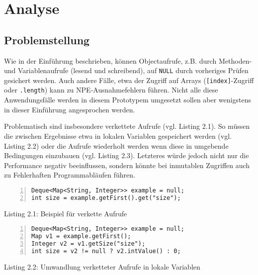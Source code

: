 
\chapter{Analyse}


\section{Problemstellung}

Wie in der Einführung beschrieben, können Objectaufrufe, z.B. durch
Methoden- und Variablenaufrufe (lesend und schreibend), auf \texttt{NULL}
durch vorheriges Prüfen gesichert werden.
Auch andere Fälle, etwa der Zugriff auf Arrays (\texttt{[index]}-Zugriff oder \texttt{.length}) kann
zu NPE-Ausnahmefehlern führen. Nicht alle diese Anwendungsfälle werden
in diesem Prototypem umgesetzt sollen aber wenigstens in dieser Einführung angesprochen werden.

Problematisch sind insbesondere verkettete Aufrufe (vgl. Listing 2.1).
So müssen die zwischen Ergebnisse etwa in lokalen Variablen gespeichert werden (vgl. Listing 2.2)
oder die Aufrufe wiederholt werden wenn diese in umgebende Bedingungen einzubauen (vgl. Listing 2.3).
Letzteres würde jedoch nicht nur die Performance negativ beeinflussen, sondern
könnte bei inmutablen Zugriffen auch zu Fehlerhaften Programmabläufen führen.

\begin{lstlisting}[basicstyle=\ttfamily,numbers=left,numberstyle=\footnotesize\ttfamily,backgroundcolor=\color{source}]
Deque<Map<String, Integer>> example = null;
int size = example.getFirst().get("size");
\end{lstlisting}
\centerline{Listing 2.1: Beispiel für verkette Aufrufe}

\vspace{0.3cm}

\begin{lstlisting}[basicstyle=\ttfamily,numbers=left,numberstyle=\footnotesize\ttfamily,backgroundcolor=\color{source}]
Deque<Map<String, Integer>> example = null;
Map v1 = example.getFirst();
Integer v2 = v1.getSize("size");
int size = v2 != null ? v2.intValue() : 0;
\end{lstlisting}
\centerline{Listing 2.2: Umwandlung verketteter Aufrufe in lokale Variablen}

